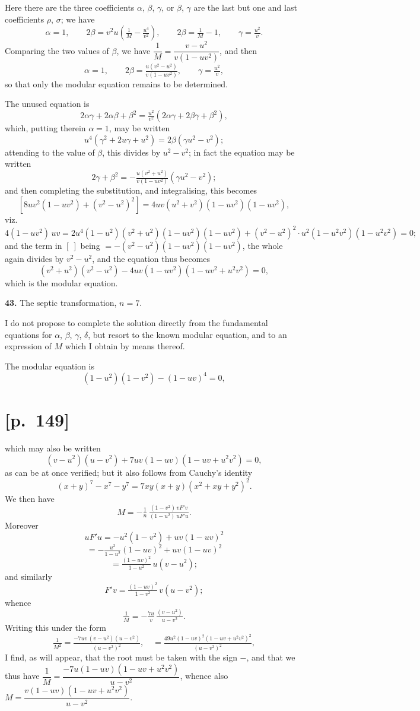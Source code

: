 \documentclass[11pt]{article}
\begin{document}
Here there are the three coefficients $\alpha$, $\beta$, $\gamma$, or $\beta$, $\gamma$ are the last but one and
last coefficients $\rho$, $\sigma$; we have
\[
\alpha=1,\qquad 2\beta=v^2u\!\left(\tfrac{1}{M}-\tfrac{u^4}{v^2}\right)\!,\qquad 2\beta=\tfrac{1}{M}-1,\qquad \gamma=\tfrac{u^2}{v}.
\]
Comparing the two values of $\beta$, we have $\dfrac{1}{M}=\dfrac{v-u^2}{v(1-uv^2)}$, and then
\[
\alpha=1,\qquad 2\beta=\tfrac{u(v^2-u^2)}{v(1-uv^2)},\qquad \gamma=\tfrac{u^2}{v},
\]
so that only the modular equation remains to be determined.

The unused equation is
\[
2\alpha\gamma+2\alpha\beta+\beta^2=\tfrac{u^2}{v^2}(2\alpha\gamma+2\beta\gamma+\beta^2),
\]
which, putting therein $\alpha=1$, may be written
\[
u^4(\gamma^2+2u\gamma+u^2)=2\beta(\gamma u^2-v^2);
\]
attending to the value of $\beta$, this divides by $u^2-v^2$; in fact the equation may be written
\[
2\gamma+\beta^2=-\tfrac{u(v^2+u^2)}{v(1-uv^2)}(\gamma u^2-v^2);
\]
and then completing the substitution, and integralising, this becomes
\[
[8uv^2(1-uv^2)+(v^2-u^2)^2]=4uv(u^2+v^2)(1-uv^2)(1-uv^2),
\]
viz.
\[
4(1-uv^2)\,uv=2u^4(1-u^2)(v^2+u^2)(1-uv^2)(1-uv^2)+(v^2-u^2)^2\cdot u^2(1-u^2v^2)(1-u^2v^2)=0;
\]
and the term in $[\ ]$ being $=-(v^2-u^2)(1-uv^2)(1-uv^2)$, the whole again divides by $v^2-u^2$,
and the equation thus becomes
\[
(v^2+u^2)(v^2-u^2)-4uv(1-uv^2)(1-uv^2+u^2v^2)=0,
\]
which is the modular equation.

\medskip
\noindent\textbf{43.} The septic transformation, $n=7$.

I do not propose to complete the solution directly from the fundamental equations
for $\alpha$, $\beta$, $\gamma$, $\delta$, but resort to the known modular equation, and to an expression of $M$
which I obtain by means thereof.

The modular equation is
\[
(1-u^2)(1-v^2)-(1-uv)^4=0,
\]

\section*{[p.~149]}
which may also be written
\[
(v-u^2)(u-v^2)+7uv(1-uv)(1-uv+u^2v^2)=0,
\]
as can be at once verified; but it also follows from Cauchy's identity
\[
(x+y)^7-x^7-y^7=7xy(x+y)(x^2+xy+y^2)^2.
\]
We then have
\[
M=-\tfrac{1}{n}\,\tfrac{(1-v^2)\,vF'v}{(1-u^2)\,uF'u}.
\]
Moreover
\[
uF'u=-u^2(1-v^2)+uv(1-uv)^2
\]
\[
=-\tfrac{u^2}{1-u^2}(1-uv)^2+uv(1-uv)^2
\]
\[
=\tfrac{(1-uv)^2}{1-u^2}\,u(v-u^2);
\]
and similarly
\[
F'v=\tfrac{(1-uv)^2}{1-v^2}\,v(u-v^2);
\]
whence
\[
\tfrac{1}{M}=-\tfrac{7u}{v}\,\tfrac{(v-u^2)}{u-v^2}.
\]
Writing this under the form
\[
\tfrac{1}{M^2}=\tfrac{-7uv\,(v-u^2)(u-v^2)}{(u-v^2)^2},\quad =\tfrac{49u^2(1-uv)^2(1-uv+u^2v^2)^2}{(u-v^2)^2},
\]
I find, as will appear, that the root must be taken with the sign $-$, and that we
thus have $\dfrac{1}{M}=\dfrac{-7u(1-uv)(1-uv+u^2v^2)}{u-v^2}$, whence also $M=\dfrac{v(1-uv)(1-uv+u^2v^2)}{u-v^2}$.
\end{document}
